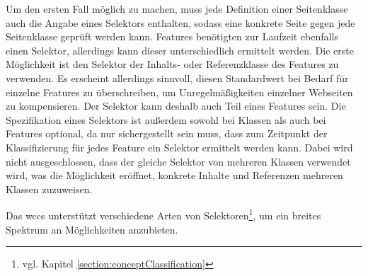         Um den ersten Fall möglich zu machen,
        muss jede Definition einer Seitenklasse auch die Angabe eines Selektors enthalten,
        sodass eine konkrete Seite gegen jede Seitenklasse geprüft werden kann.
        Features benötigten zur Laufzeit ebenfalls einen Selektor,
        allerdings kann dieser unterschiedlich ermittelt werden.
        Die erste Möglichkeit ist den Selektor der Inhalts- oder
        Referenzklasse des Features zu verwenden.
        Es erscheint allerdings sinnvoll, diesen Standardwert bei Bedarf für einzelne Features
        zu überschreiben, um Unregelmäßigkeiten einzelner Webseiten zu kompensieren.
        Der Selektor kann deshalb auch Teil eines Features sein.
        Die Spezifikation eines Selektors ist außerdem sowohl
        bei Klassen als auch bei Features optional,
        da nur sichergestellt sein muss, dass zum Zeitpunkt der Klassifizierung für jedes
        Feature ein Selektor ermittelt werden kann.        
        Dabei wird nicht ausgeschlossen, dass der gleiche Selektor von mehreren Klassen verwendet wird,
        was die Möglichkeit eröffnet, konkrete Inhalte und Referenzen mehreren Klassen zuzuweisen.

        Das \gls{wccs} unterstützt verschiedene Arten von
        Selektoren\footnote{vgl. Kapitel \ref{section:conceptClassification}},
        um ein breites Spektrum an Möglichkeiten anzubieten.
